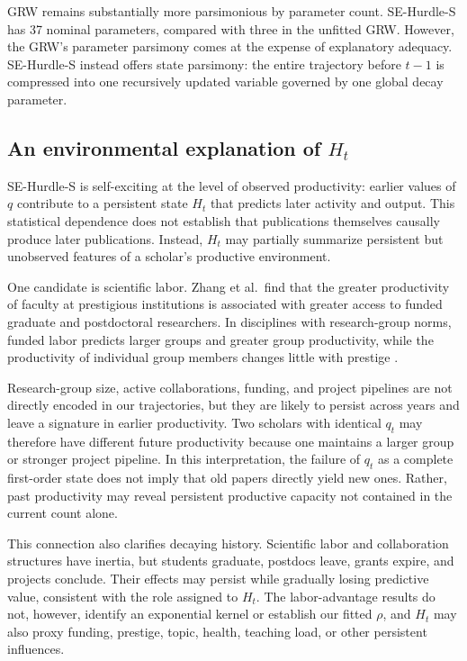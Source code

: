 \documentclass[twocolumn, letterpaper]{article}
\begin{document}
GRW remains substantially more parsimonious by parameter count. SE-Hurdle-S has 37 nominal parameters, compared with three in the unfitted GRW. However, the GRW's parameter parsimony comes at the expense of explanatory adequacy. SE-Hurdle-S instead offers state parsimony: the entire trajectory before $t-1$ is compressed into one recursively updated variable governed by one global decay parameter.

\subsection{An environmental explanation of \texorpdfstring{$H_t$}{H_t}}
\label{disc:alternate_ht_explanation}

SE-Hurdle-S is self-exciting at the level of observed productivity: earlier values of $q$ contribute to a persistent state $H_t$ that predicts later activity and output. This statistical dependence does not establish that publications themselves causally produce later publications. Instead, $H_t$ may partially summarize persistent but unobserved features of a scholar's productive environment.

One candidate is scientific labor. Zhang et al.\ find that the greater productivity of faculty at prestigious institutions is associated with greater access to funded graduate and postdoctoral researchers. In disciplines with research-group norms, funded labor predicts larger groups and greater group productivity, while the productivity of individual group members changes little with prestige \cite{laboradvantages}.

Research-group size, active collaborations, funding, and project pipelines are not directly encoded in our trajectories, but they are likely to persist across years and leave a signature in earlier productivity. Two scholars with identical $q_t$ may therefore have different future productivity because one maintains a larger group or stronger project pipeline. In this interpretation, the failure of $q_t$ as a complete first-order state does not imply that old papers directly yield new ones. Rather, past productivity may reveal persistent productive capacity not contained in the current count alone.

This connection also clarifies decaying history. Scientific labor and collaboration structures have inertia, but students graduate, postdocs leave, grants expire, and projects conclude. Their effects may persist while gradually losing predictive value, consistent with the role assigned to $H_t$. The labor-advantage results do not, however, identify an exponential kernel or establish our fitted $\rho$, and $H_t$ may also proxy funding, prestige, topic, health, teaching load, or other persistent influences.
\end{document}
